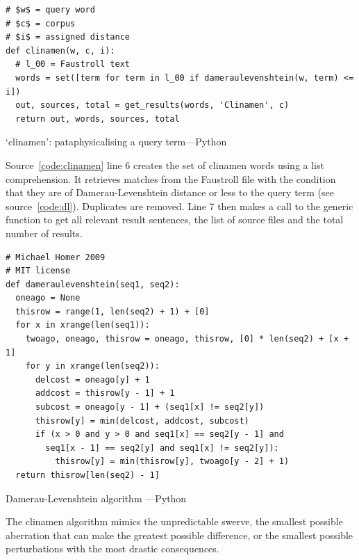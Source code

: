\begin{listing}[!htbp] %
  \begin{verbatim}
# $w$ = query word
# $c$ = corpus
# $i$ = assigned distance
def clinamen(w, c, i):
  # l_00 = Faustroll text
  words = set([term for term in l_00 if dameraulevenshtein(w, term) <= i])
  out, sources, total = get_results(words, 'Clinamen', c)
  return out, words, sources, total
  \end{verbatim}
\caption[`clinamen' function---Python]{`clinamen': pataphysicalising a query term---Python}
\label{code:clinamen}
\end{listing}

Source~\ref{code:clinamen} line 6 creates the set of clinamen words using a list comprehension. It retrieves matches from the Faustroll file  with the condition that they are of Damerau-Levenshtein distance  or less to the query term  (see source~\ref{code:dl}). Duplicates are removed. Line 7 then makes a call to the generic  function to get all relevant result sentences, the list of source files and the total number of results.

\begin{listing}[!htbp] %
  \begin{verbatim}
# Michael Homer 2009
# MIT license
def dameraulevenshtein(seq1, seq2):
  oneago = None
  thisrow = range(1, len(seq2) + 1) + [0]
  for x in xrange(len(seq1)):
    twoago, oneago, thisrow = oneago, thisrow, [0] * len(seq2) + [x + 1]
    for y in xrange(len(seq2)):
      delcost = oneago[y] + 1
      addcost = thisrow[y - 1] + 1
      subcost = oneago[y - 1] + (seq1[x] != seq2[y])
      thisrow[y] = min(delcost, addcost, subcost)
      if (x > 0 and y > 0 and seq1[x] == seq2[y - 1] and
        seq1[x - 1] == seq2[y] and seq1[x] != seq2[y]):
          thisrow[y] = min(thisrow[y], twoago[y - 2] + 1)
  return thisrow[len(seq2) - 1]
  \end{verbatim}
\caption[`dameraulevenshtein' function---Python]{Damerau-Levenshtein algorithm \autocite{Homer2009}---Python}
\label{code:dl}
\end{listing}

The clinamen algorithm mimics the unpredictable swerve, the smallest possible aberration that can make the greatest possible difference, or the smallest possible perturbations with the most drastic consequences. 


